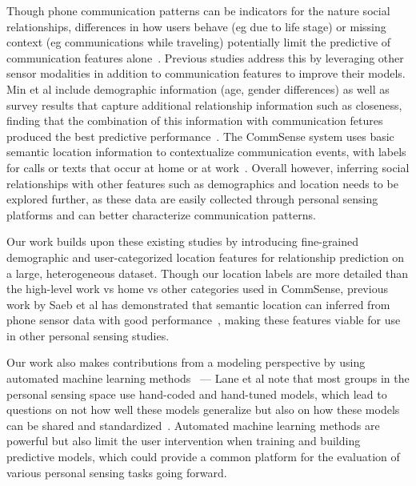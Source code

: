 \documentclass[acmlarge]{acmart}
\begin{document}
Though phone communication patterns can be indicators for the nature social relationships, differences in how users behave (eg due to life stage) or missing context (eg communications while traveling) potentially limit the predictive of communication features alone~\cite{wiese2015you}. Previous studies address this by leveraging other sensor modalities in addition to communication features to improve their models. Min et al include demographic information (age, gender differences) as well as survey results that capture additional relationship information such as closeness, finding that the combination of this information with communication fetures produced the best predictive performance~\cite{min2013mining}. The CommSense system uses basic semantic location information to contextualize communication events, with labels for calls or texts that occur at home or at work~\cite{bao2015commsense}. Overall however, inferring social relationships with other features such as demographics and location needs to be explored further, as these data are easily collected through personal sensing platforms and can better characterize communication patterns.

Our work builds upon these existing studies by introducing fine-grained demographic and user-categorized location features for relationship prediction on a large, heterogeneous dataset. Though our location labels are more detailed than the high-level work vs home vs other categories used in CommSense, previous work by Saeb et al has demonstrated that semantic location can inferred from phone sensor data with good performance~\cite{saeb2017mobile}, making these features viable for use in other personal sensing studies.

Our work also makes contributions from a modeling perspective by using automated machine learning methods~\cite{feurer2015efficient} --- Lane et al note that most groups in the personal sensing space use hand-coded and hand-tuned models, which lead to questions on not how well these models generalize but also on how these models can be shared and standardized~\cite{lane2010survey}. Automated machine learning methods are powerful but also limit the user intervention when training and building predictive models, which could provide a common platform for the evaluation of various personal sensing tasks going forward.
\end{document}
